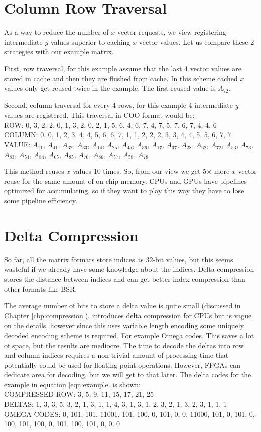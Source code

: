 \section{Column Row Traversal}
\label{sec:colrow}
    As a way to reduce the number of $x$ vector requests, we view registering intermediate $y$ values superior to caching $x$ vector values. Let us compare these 2 strategies with our example matrix. \par
First, row traversal, for this example assume that the last 4 vector values are stored in cache and then they are flushed from cache. In this scheme cached $x$ values only get reused twice in the example. The first reused value is $A_{72}$. \par
Second, column traversal for every 4 rows, for this example 4 intermediate $y$ values are registered. This traversal in COO format would be:\\
ROW: 0, 3, 2, 2, 0, 1, 3, 2, 0, 2, 1, 5, 6, 4, 6, 7, 4, 7, 5, 7, 6, 7, 4, 4, 6\\
COLUMN: 0, 0, 1, 2, 3, 4, 4, 5, 6, 6, 7, 1, 1, 2, 2, 2, 3, 3, 4, 4, 5, 5, 6, 7, 7\\
VALUE: $A_{11}$, $A_{41}$, $A_{32}$, $A_{33}$, $A_{14}$, $A_{25}$, $A_{45}$, $A_{36}$, $A_{17}$, $A_{37}$, $A_{28}$, $A_{62}$, $A_{72}$, $A_{53}$, $A_{73}$, $A_{83}$, $A_{54}$, $A_{84}$, $A_{65}$, $A_{85}$, $A_{76}$, $A_{86}$, $A_{57}$, $A_{58}$, $A_{78}$\par
This method reuses $x$ values 10 times. So, from our view we get 5$\times$ more $x$ vector reuse for the same amount of on chip memory. CPUs and GPUs have pipelines optimized for accumulating, so if they want to play this way they have to lose some pipeline efficiency.
\section{Delta Compression}
So far, all the matrix formats store indices as 32-bit values, but this seems wasteful if we already have some knowledge about the indices. Delta compression stores the distance between indices and can get better index compression than other formats like BSR.
\par The average number of bits to store a delta value is quite small (discussed in Chapter \ref{chp:compression}). \cite{prelim:kourtis} introduces delta compression for CPUs but is vague on the details, however since this uses variable length encoding some uniquely decoded encoding scheme is required. For example Omega codes. This saves a lot of space, but the results are mediocre. The time to decode the deltas into row and column indices requires a non-trivial amount of processing time that potentially could be used for floating point operations. However, FPGAs can dedicate area for decoding, but we will get to that later. The delta codes for the example in equation \ref{eqn:example} is shown:\\
   COMPRESSED ROW: 3, 5, 9, 11, 15, 17, 21, 25 \\
DELTAS: 1, 3, 3, 5, 3, 2, 1, 3, 1, 1, 4, 3, 1, 3, 1, 2, 3, 2, 1, 3, 2, 3, 1, 1, 1\\
OMEGA CODES: 0, 101, 101, 11001, 101, 100, 0, 101, 0, 0, 11000, 101, 0, 101, 0, 100, 101, 100, 0, 101, 100, 101, 0, 0, 0 \par
